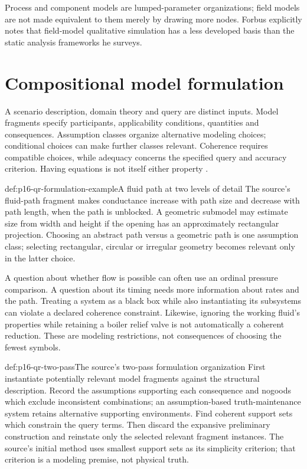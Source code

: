 Process and component models are lumped-parameter organizations; field
models are not made equivalent to them merely by drawing more nodes.
Forbus explicitly notes that field-model qualitative simulation has a less
developed basis than the static analysis frameworks he surveys.
\section{Compositional model formulation}
\label{sec:p16-qr-model-formulation}

A scenario description, domain theory and query are distinct inputs.
Model fragments specify participants, applicability conditions, quantities and
consequences. Assumption classes organize alternative modeling choices;
conditional choices can make further classes relevant. Coherence requires
compatible choices, while adequacy concerns the specified query and accuracy
criterion. Having equations is not itself either property
\cite[sec.~9.5]{Forbus2008QualitativeModeling}.

\begin{hbexample}{def:p16-qr-formulation-example}{A fluid path at two levels of detail}
The source's fluid-path fragment makes conductance increase with path size
and decrease with path length, when the path is unblocked. A geometric
submodel may estimate size from width and height if the opening has an
approximately rectangular projection. Choosing an abstract path versus a
geometric path is one assumption class; selecting rectangular, circular or
irregular geometry becomes relevant only in the latter choice.

A question about whether flow is possible can often use an ordinal pressure
comparison. A question about its timing needs more information about rates
and the path. Treating a system as a black box while also instantiating its
subsystems can violate a declared coherence constraint. Likewise, ignoring
the working fluid's properties while retaining a boiler relief valve is not
automatically a coherent reduction. These are modeling restrictions, not
consequences of choosing the fewest symbols.
\end{hbexample}

\begin{hbmethod}{def:p16-qr-two-pass}{The source's two-pass formulation organization}
First instantiate potentially relevant model fragments against the structural
description. Record the assumptions supporting each consequence and nogoods
which exclude inconsistent combinations; an assumption-based truth-maintenance
system retains alternative supporting environments. Find coherent support
sets which constrain the query terms. Then discard the expansive preliminary
construction and reinstate only the selected relevant fragment instances.
The source's initial method uses smallest support sets as its simplicity
criterion; that criterion is a modeling premise, not physical truth.
\end{hbmethod}

